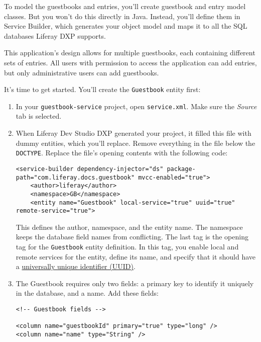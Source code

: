 To model the guestbooks and entries, you'll create guestbook and entry
model classes. But you won't do this directly in Java. Instead, you'll
define them in Service Builder, which generates your object model and
maps it to all the SQL databases Liferay DXP supports.

This application's design allows for multiple guestbooks, each
containing different sets of entries. All users with permission to
access the application can add entries, but only administrative users
can add guestbooks.

It's time to get started. You'll create the \texttt{Guestbook} entity
first:

\begin{enumerate}
\def\labelenumi{\arabic{enumi}.}
\item
  In your \texttt{guestbook-service} project, open \texttt{service.xml}.
  Make sure the \emph{Source} tab is selected.
\item
  When Liferay Dev Studio DXP generated your project, it filled this
  file with dummy entities, which you'll replace. Remove everything in
  the file below the \texttt{DOCTYPE}. Replace the file's opening
  contents with the following code:

\begin{verbatim}
<service-builder dependency-injector="ds" package-path="com.liferay.docs.guestbook" mvcc-enabled="true">
    <author>liferay</author>
    <namespace>GB</namespace>
    <entity name="Guestbook" local-service="true" uuid="true" remote-service="true">
\end{verbatim}

  This defines the author, namespace, and the entity name. The namespace
  keeps the database field names from conflicting. The last tag is the
  opening tag for the \texttt{Guestbook} entity definition. In this tag,
  you enable local and remote services for the entity, define its name,
  and specify that it should have a
  \href{https://en.wikipedia.org/wiki/Universally_unique_identifier}{universally
  unique identifier (UUID)}.
\item
  The Guestbook requires only two fields: a primary key to identify it
  uniquely in the database, and a name. Add these fields:

\begin{verbatim}
<!-- Guestbook fields -->

<column name="guestbookId" primary="true" type="long" />
<column name="name" type="String" />
\end{verbatim}


\end{enumerate}
